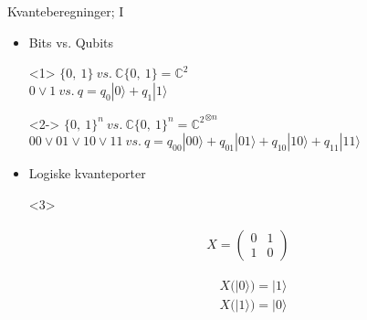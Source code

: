 \documentclass[norsk]{beamer}
\begin{document}
	\begin{frame}{Kvanteberegninger; I}
		\begin{itemize}
			\item Bits vs. Qubits \\
			\begin{onlyenv}<1>
				\begin{math}
					\{0,\ 1\}\ vs.\ \mathbb{C}\{0,\ 1\} = \mathbb{C}^2
				\end{math} \\
				\begin{math}
					0 \vee 1\ vs.\ q = q_0|0\rangle + q_1|1\rangle
				\end{math}
			\end{onlyenv}

			\begin{onlyenv}<2->
				\begin{math}
					\{0,\ 1\}^n\ vs.\ \mathbb{C}\{0,\ 1\}^n = {\mathbb{C}^2}^{\otimes n}
				\end{math} \\
				\begin{math}
					00 \vee 01 \vee 10 \vee 11\ vs.\ q = q_{00}|00\rangle + q_{01}|01\rangle + q_{10}|10\rangle + q_{11}|11\rangle
				\end{math}
			\end{onlyenv}

			\item Logiske kvanteporter \\
			\begin{onlyenv}<3>
				\begin{minipage}{0.25\textwidth}
					\begin{align*}
						X = \begin{pmatrix*}
							0 & 1 \\
							1 & 0
						\end{pmatrix*}
					\end{align*}
				\end{minipage}
				\begin{minipage}{0.25\textwidth}
					\begin{align*}
						& X(|0\rangle) = |1\rangle \\
						& X(|1\rangle) = |0\rangle
					\end{align*}
				\end{minipage}
			\end{onlyenv}


\end{itemize}
\end{frame}
\end{document}
